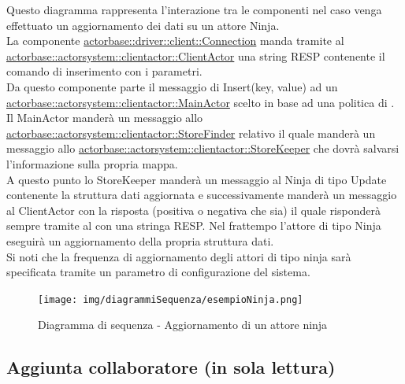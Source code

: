 \documentclass{scalatekids-article}
\begin{document}
Questo diagramma rappresenta l'interazione tra le componenti nel caso venga
effettuato un aggiornamento dei dati su un attore Ninja.\\
La componente \hyperref[sec:actorbase::driver::client::Connection]{actorbase::driver::client::Connection}
manda tramite  al \hyperref[sec:actorbase::actorsystem::clientactor::ClientActor]{actorbase::actorsystem::clientactor::ClientActor}
una string RESP contenente il comando di inserimento  con
i parametri.\\ %
Da questo componente parte il messaggio di Insert(key, value) ad un \hyperref[sec:actorbase::actorsystem::clientactor::MainActor]{actorbase::actorsystem::clientactor::MainActor} scelto in base ad una
politica di . Il MainActor manderà un messaggio allo \hyperref[sec:actorbase::actorsystem::clientactor::StoreFinder]{actorbase::actorsystem::clientactor::StoreFinder} relativo il quale manderà un messaggio allo \hyperref[sec:actorbase::actorsystem::clientactor::StoreKeeper]{actorbase::actorsystem::clientactor::StoreKeeper} che dovrà salvarsi l'informazione
sulla propria mappa.\\
A questo punto lo StoreKeeper manderà un messaggio al Ninja di tipo Update contenente la struttura dati aggiornata e successivamente manderà un
messaggio al ClientActor con la risposta (positiva o negativa che sia)
il quale risponderà sempre tramite  al  con
una stringa RESP.
Nel frattempo l'attore di tipo Ninja eseguirà un aggiornamento della propria struttura dati.\\
Si noti che la frequenza di aggiornamento degli attori di tipo ninja sarà
specificata tramite un parametro di configurazione del sistema.
\begin{figure}[H]
  \begin{center}
    \texttt{[image: img/diagrammiSequenza/esempioNinja.png]}
    \caption{Diagramma di sequenza - Aggiornamento di un attore ninja}
  \end{center}
\end{figure}

\subsection{Aggiunta collaboratore (in sola lettura)}
\end{document}
